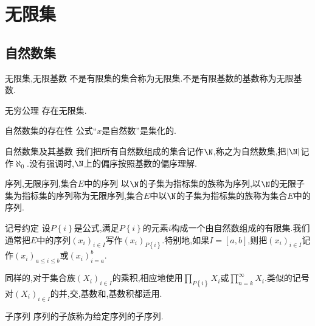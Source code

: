 \chapter{无限集}

\section{自然数集}

\begin{definition}{无限集,无限基数}{}
	不是有限集的集合称为无限集.不是有限基数的基数称为无限基数.
\end{definition}

\begin{axiom}{无穷公理}{}
	存在无限集.
\end{axiom}

\begin{theorem}{自然数集的存在性}{}
	公式``$x$是自然数''是集化的.
\end{theorem}

\begin{definition}{自然数集及其基数}{}
	我们把所有自然数组成的集合记作$\N$,称之为自然数集,把$\left|\N\right|$记作$\aleph_{0}$.没有强调时,$\N$上的偏序按照基数的偏序理解.
\end{definition}

\begin{definition}{序列,无限序列,集合$E$中的序列}{}
	以$\N$的子集为指标集的族称为序列,以$\N$的无限子集为指标集的序列称为无限序列,集合$E$中以$\N$的子集为指标集的族称为集合$E$中的序列.
\end{definition}

\begin{remark}{记号约定}{}
	设$P\left\{i\right\}$是公式,满足$P\left\{i\right\}$的元素$i$构成一个由自然数组成的有限集.我们通常把$E$中的序列$\left(x_{i}\right)_{i\in I}$写作$\left(x_{i}\right)_{P\left\{i\right\}}$.特别地,如果$I=\left[a,b\right]$,则把$\left(x_{i}\right)_{i\in I}$记作$\left(x_{i}\right)_{a\leq i\leq b}$或$\left(x_{i}\right)_{i=a}^{b}$.
	
	同样的,对于集合族$\left(X_{i}\right)_{i\in I}$的乘积,相应地使用$\prod\limits_{P\left\{i\right\}}X_{i}$或$\prod\limits_{n=k}^{\infty}X_{i}$.类似的记号对$\left(X_{i}\right)_{i\in I}$的并,交,基数和,基数积都适用.
\end{remark}

\begin{definition}{子序列}{}
	序列的子族称为给定序列的子序列.
\end{definition}

